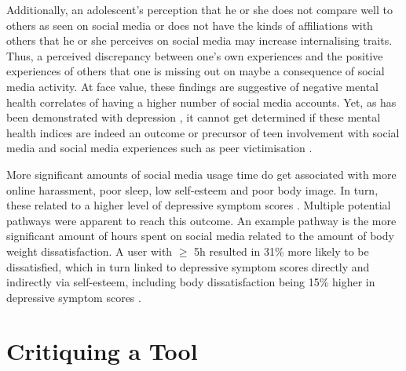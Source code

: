 \documentclass{sigchi}
\begin{document}
	Additionally, an adolescent's perception that he or she does not compare well to others as seen on social media or does not have the kinds of affiliations with others that he or she perceives on social media may increase internalising traits. Thus, a perceived discrepancy between one's own experiences and the positive experiences of others that one is missing out on maybe a consequence of social media activity. At face value, these findings are suggestive of negative mental health correlates of having a higher number of social media accounts. Yet, as has been demonstrated with depression \cite{frison2016short}, it cannot get determined if these mental health indices are indeed an outcome or precursor of teen involvement with social media and social media experiences such as peer victimisation \cite{barry2017adolescent}.
	
	More significant amounts of social media usage time do get associated with more online harassment, poor sleep, low self-esteem and poor body image. In turn, these related to a higher level of depressive symptom scores \cite{kelly2018social}. Multiple potential pathways were apparent to reach this outcome. An example pathway is the more significant amount of hours spent on social media related to the amount of body weight dissatisfaction. A user with $\geq$ 5h resulted in 31\% more likely to be dissatisfied, which in turn linked to depressive symptom scores directly and indirectly via self-esteem, including body dissatisfaction being 15\% higher in depressive symptom scores \cite{kelly2018social}.

\section{Critiquing a Tool}

\end{document}
